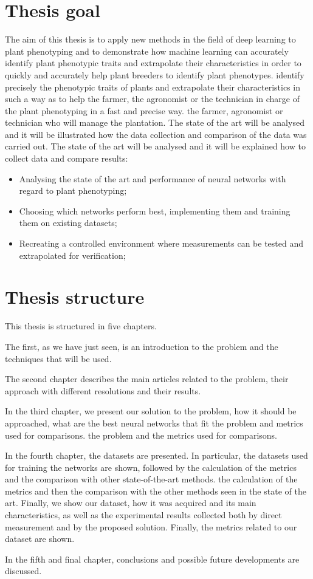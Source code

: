 \section{Thesis goal}
The aim of this thesis is to apply new methods in the field of deep learning to plant phenotyping and to demonstrate how machine learning can accurately identify plant
phenotypic traits and extrapolate their characteristics in order to quickly and accurately help plant breeders to identify plant phenotypes. identify precisely the
phenotypic traits of plants and extrapolate their characteristics in such a way as to help the farmer, the agronomist or the technician in charge of the plant phenotyping
in a fast and precise way. the farmer, agronomist or technician who will manage the plantation. The state of the art will be analysed and it will be illustrated how the
data collection and comparison of the data was carried out. The state of the art will be analysed and it will be explained how to collect data and compare results:
\begin{itemize}
    \item Analysing the state of the art and performance of neural networks with regard to plant phenotyping;
    \item Choosing which networks perform best, implementing them and training them on existing datasets; 
    \item Recreating a controlled environment where measurements can be tested and extrapolated for verification;
\end{itemize}


\section{Thesis structure}
This thesis is structured in five chapters.

The first, as we have just seen, is an introduction to the problem and the techniques that will be used.

The second chapter describes the main articles related to the problem, their approach with different resolutions and their results.

In the third chapter, we present our solution to the problem, how it should be approached, what are the best neural networks that fit the problem and metrics used
for comparisons. the problem and the metrics used for comparisons.

In the fourth chapter, the datasets are presented. In particular, the datasets used for training the networks are shown, followed by the calculation of the metrics
and the comparison with other state-of-the-art methods. the calculation of the metrics and then the comparison with the other methods seen in the state of the art.
Finally, we show our dataset, how it was acquired and its main characteristics, as well as the experimental results collected both by direct measurement and by the
proposed solution. Finally, the metrics related to our dataset are shown.

In the fifth and final chapter, conclusions and possible future developments are discussed.





